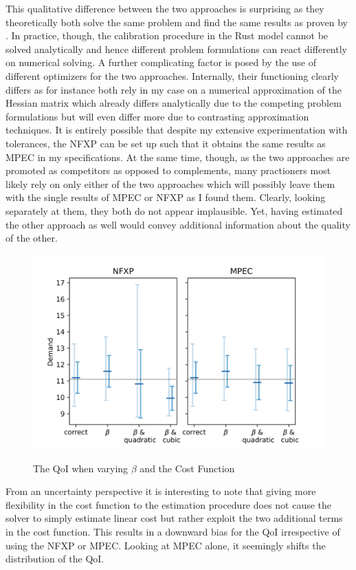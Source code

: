 This qualitative difference between the two approaches is surprising as they theoretically both solve the same problem and find the same results as proven by \cite{Su.Judd.2012}. In practice, though, the calibration procedure in the Rust model cannot be solved analytically and hence different problem formulations can react differently on numerical solving. A further complicating factor is posed by the use of different optimizers for the two approaches. Internally, their functioning clearly differs as for instance both rely in my case on a numerical approximation of the Hessian matrix which already differs analytically due to the competing problem formulations but will even differ more due to contrasting approximation techniques. It is entirely possible that despite my extensive experimentation with tolerances, the NFXP can be set up such that it obtains the same results as MPEC in my specifications. At the same time, though, as the two approaches are promoted as competitors as opposed to complements, many practioners most likely rely on only either of the two approaches which will possibly leave them with the single results of MPEC or NFXP as I found them. Clearly, looking separately at them, they both do not appear implausible. Yet, having estimated the other approach as well would convey additional information about the quality of the other.

\begin{figure}[!b]
	\caption{The QoI when varying $\beta$ and the Cost Function}
	\vspace*{-4mm}
	\centering
	\includegraphics[scale=0.9]{../figures/figure_6.png}
	\label{figure6}
\end{figure}

From an uncertainty perspective it is interesting to note that giving more flexibility in the cost function to the estimation procedure does not cause the solver to simply estimate linear cost but rather exploit the two additional terms in the cost function. This results in a downward bias for the QoI irrespective of using the NFXP or MPEC. Looking at MPEC alone, it seemingly shifts the distribution of the QoI.

